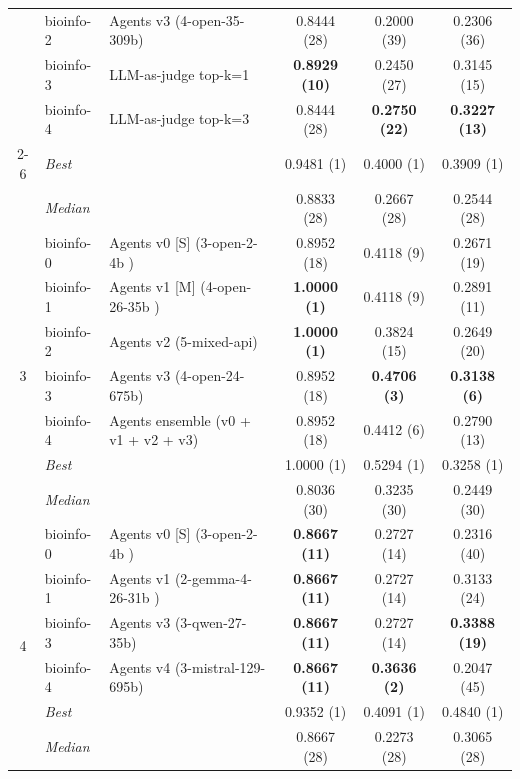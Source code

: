 \begin{table}[ht]
\begin{tabular}{cl|p{5.8cm}|ccc}
    & bioinfo-2 & Agents v3 (4-open-35-309b) & 0.8444 (28) & 0.2000 (39) & 0.2306 (36) \\
    & bioinfo-3 & LLM-as-judge top-k=1 & \textbf{0.8929 (10)} & 0.2450 (27) & 0.3145 (15) \\
    & bioinfo-4 & LLM-as-judge top-k=3 & 0.8444 (28) & \textbf{0.2750 (22)} & \textbf{0.3227 (13)} \\
    \cmidrule(l){2-6}
    & \textit{Best} & \multicolumn{1}{l|}{} & 0.9481 (1) & 0.4000 (1) & 0.3909 (1) \\
    & \textit{Median}& \multicolumn{1}{l|}{} & 0.8833 (28) & 0.2667 (28) & 0.2544 (28) \\
    \midrule
    \multirow{7}{*}{3}
    & bioinfo-0 & Agents v0 [S] (3-open-2-4b ) & 0.8952 (18) & 0.4118 (9) & 0.2671 (19) \\
    & bioinfo-1 & Agents v1 [M] (4-open-26-35b ) & \textbf{1.0000 (1)} & 0.4118 (9) & 0.2891 (11) \\
    & bioinfo-2 & Agents v2 (5-mixed-api) & \textbf{1.0000 (1)} & 0.3824 (15) & 0.2649 (20) \\
    & bioinfo-3 & Agents v3 (4-open-24-675b) & 0.8952 (18) & \textbf{0.4706 (3)} & \textbf{0.3138 (6)} \\
    & bioinfo-4 & Agents ensemble (v0 + v1 + v2 + v3) & 0.8952 (18) & 0.4412 (6) & 0.2790 (13) \\
    \cmidrule(l){2-6}
    & \textit{Best} & \multicolumn{1}{l|}{} & 1.0000 (1) & 0.5294 (1) & 0.3258 (1) \\
    & \textit{Median}& \multicolumn{1}{l|}{} & 0.8036 (30) & 0.3235 (30) & 0.2449 (30) \\
    \midrule
    \multirow{6}{*}{4}
    & bioinfo-0 & Agents v0 [S] (3-open-2-4b ) & \textbf{0.8667 (11)} & 0.2727 (14) & 0.2316 (40) \\
    & bioinfo-1 & Agents v1 (2-gemma-4-26-31b ) & \textbf{0.8667 (11)} & 0.2727 (14) & 0.3133 (24) \\
    & bioinfo-3 & Agents v3 (3-qwen-27-35b) & \textbf{0.8667 (11)} & 0.2727 (14) & \textbf{0.3388 (19)} \\
    & bioinfo-4 & Agents v4 (3-mistral-129-695b) & \textbf{0.8667 (11)} & \textbf{0.3636 (2)} & 0.2047 (45) \\
    \cmidrule(l){2-6}
    & \textit{Best} & \multicolumn{1}{l|}{} & 0.9352 (1) & 0.4091 (1) & 0.4840 (1) \\
    & \textit{Median}& \multicolumn{1}{l|}{} & 0.8667 (28) & 0.2273 (28) & 0.3065 (28) \\
    \bottomrule
  \end{tabular}
\end{table}

